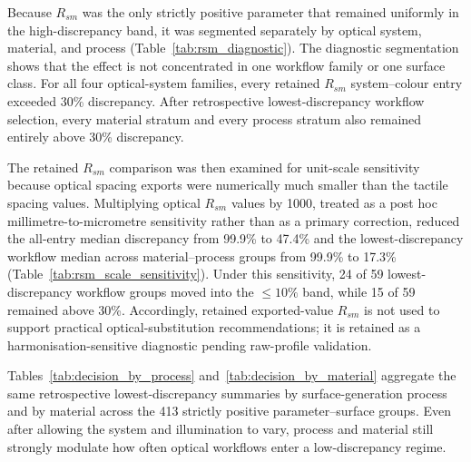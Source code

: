 \documentclass{article}
\begin{document}


Because $R_{sm}$ was the only strictly positive parameter that remained uniformly in the high-discrepancy band, it was segmented separately by optical system, material, and process (Table~\ref{tab:rsm_diagnostic}). The diagnostic segmentation shows that the effect is not concentrated in one workflow family or one surface class. For all four optical-system families, every retained $R_{sm}$ system--colour entry exceeded 30\% discrepancy. After retrospective lowest-discrepancy workflow selection, every material stratum and every process stratum also remained entirely above 30\% discrepancy.



The retained $R_{sm}$ comparison was then examined for unit-scale sensitivity because optical spacing exports were numerically much smaller than the tactile spacing values. Multiplying optical $R_{sm}$ values by 1000, treated as a post hoc millimetre-to-micrometre sensitivity rather than as a primary correction, reduced the all-entry median discrepancy from 99.9\% to 47.4\% and the lowest-discrepancy workflow median across material--process groups from 99.9\% to 17.3\% (Table~\ref{tab:rsm_scale_sensitivity}). Under this sensitivity, 24 of 59 lowest-discrepancy workflow groups moved into the $\leq 10\%$ band, while 15 of 59 remained above 30\%. Accordingly, retained exported-value $R_{sm}$ is not used to support practical optical-substitution recommendations; it is retained as a harmonisation-sensitive diagnostic pending raw-profile validation.



Tables~\ref{tab:decision_by_process} and~\ref{tab:decision_by_material} aggregate the same retrospective lowest-discrepancy summaries by surface-generation process and by material across the 413 strictly positive parameter--surface groups. Even after allowing the system and illumination to vary, process and material still strongly modulate how often optical workflows enter a low-discrepancy regime.
\end{document}
